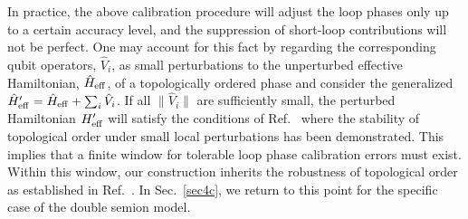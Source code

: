 \documentclass[twocolumn,floats,prx,showpacs]{revtex4-1}
\newcommand{\alex}[1]{{\color{alex} #1}}
\begin{document}
\alex{In practice, the above calibration procedure will adjust the loop phases only up to a certain accuracy level, and the  suppression of short-loop contributions will not be perfect.
One may account for this fact by regarding the corresponding qubit operators, $\hat V_i$, as small perturbations to the unperturbed effective Hamiltonian, 
$\hat H_{\rm eff}$,  of  a topologically ordered phase and consider the generalized 
$\hat H_{\rm eff}'= \hat H_{\rm eff} + \sum_i \hat V_i$.
If all $ \|\hat V_{i} \|$ are sufficiently small, the perturbed Hamiltonian
$H'_{\rm eff}$  will satisfy the conditions of Ref.~\cite{1001.0344} where the stability of topological order under small local
perturbations has been demonstrated.  This implies that a finite window for tolerable loop phase calibration errors must exist. Within this window, our construction inherits the 
robustness of topological order as established in Ref.~\cite{1001.0344}.  In Sec.~\ref{sec4c}, we return to this 
point for the specific case of the double semion model. }
\end{document}
